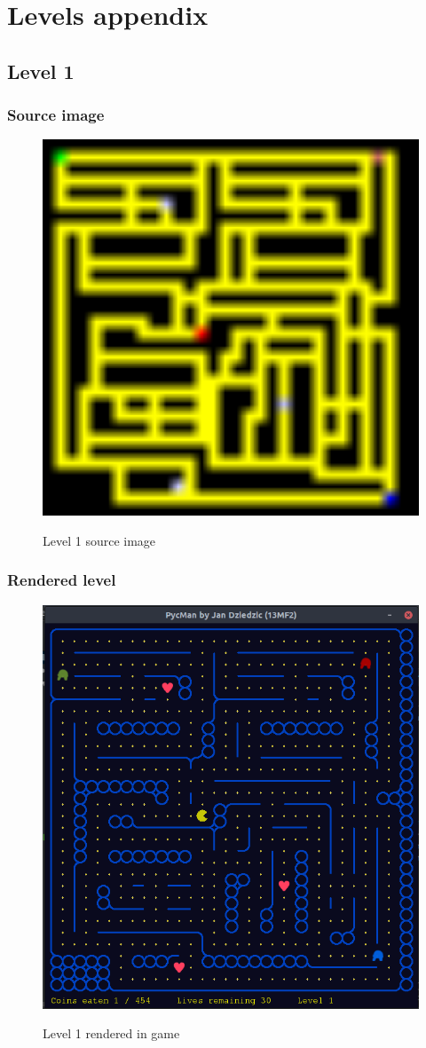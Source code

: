 \documentclass[11pt,a4paper,notitlepage]{report}
\newcommand{\dsubsection}[1]{\FloatBarrier \subsection{#1}}
\newenvironment{img}{
	\begin{center}
		\begin{figure}[H]
			\begin{center}
			
}{
	\end{center}
		\end{figure}
			\end{center}
}
\begin{document}
	\chapter{Levels appendix}
		\newpage
		\section{Level 1}
			\dsubsection{Source image}
			\begin{img}
				\includegraphics[width=350pt]{images/level1}\\
				\caption{Level 1 source image}
			\end{img}
			\dsubsection{Rendered level}
				\begin{img}
					\includegraphics[width=350pt]{images/level1_r}\\
					\caption{Level 1 rendered in game}
				\end{img}
\end{document}

